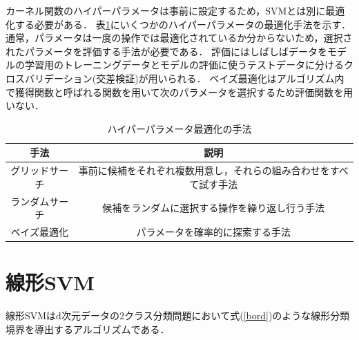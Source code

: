 \documentclass[11pt,a4paper,titlepage]{ltjsarticle}
\begin{document}
\clearpage
カーネル関数のハイパーパラメータは事前に設定するため，SVMとは別に最適化する必要がある．
表\ref{tuning}にいくつかのハイパーパラメータの最適化手法を示す．
通常，パラメータは一度の操作では最適化されているか分からないため，選択されたパラメータを評価する手法が必要である．
評価にはしばしばデータをモデルの学習用のトレーニングデータとモデルの評価に使うテストデータに分けるクロスバリデーション(交差検証)が用いられる\cite{cross}．
ベイズ最適化はアルゴリズム内で獲得関数と呼ばれる関数を用いて次のパラメータを選択するため評価関数を用いない\cite{beiz}．

\begin{table}[H]
    \centering
    \caption{ハイパーパラメータ最適化の手法}
    \label{tuning}
    \begin{tabular}{|c|c|} \hline
        手法 & 説明 \\ \hline \hline
        グリッドサーチ & 事前に候補をそれぞれ複数用意し，それらの組み合わせをすべて試す手法\\ \hline
        ランダムサーチ & 候補をランダムに選択する操作を繰り返し行う手法 \\ \hline
        ベイズ最適化 & パラメータを確率的に探索する手法 \\ \hline
    \end{tabular}
\end{table}
\clearpage

\section{線形SVM}
\label{sec:linear}
線形SVMはd次元データの2クラス分類問題において式(\ref{bord})のような線形分類境界を導出するアルゴリズムである．
\end{document}
